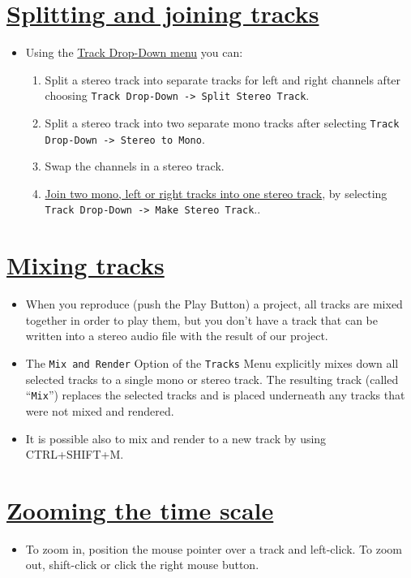 \section{\href{http://manual.audacityteam.org/o/man/splitting_and_joining_stereo_tracks.html}{Splitting and joining tracks}}
\begin{itemize}
\item Using the
  \href{http://manual.audacityteam.org/o/man/track_drop_down_menu.html}{Track
    Drop-Down menu} you can:
  \begin{enumerate}
  \item Split a stereo track into separate tracks for left and right
    channels after choosing
    \verb|Track Drop-Down -> Split Stereo Track|.
  \item Split a stereo track into two separate mono tracks after
    selecting
    \verb|Track Drop-Down -> Stereo to Mono|.
  \item Swap the channels in a stereo track.
  \item
    \href{http://manual.audacityteam.org/o/man/audio_tracks.html}{Join
      two mono, left or right tracks into one stereo track}, by
    selecting \verb|Track Drop-Down -> Make Stereo Track|..
  \end{enumerate}
\end{itemize}

\section{\href{http://manual.audacityteam.org/o/man/tracks_menu.html\#mix}{Mixing tracks}}
\begin{itemize}
\item When you reproduce (push the Play Button) a project, all tracks
  are mixed together in order to play them, but you don't have a track
  that can be written into a stereo audio file with the result of our
  project.
\item The \verb|Mix and Render| Option of the \verb|Tracks| Menu
  explicitly mixes down all selected tracks to a single mono or stereo
  track.  The resulting track (called ``\verb|Mix|'') replaces the
  selected tracks and is placed underneath any tracks that were not
  mixed and rendered.
\item It is possible also to mix and render to a new track by using
  CTRL+SHIFT+M.
\end{itemize}

\section{\href{http://manual.audacityteam.org/o/man/zooming.html}{Zooming the time scale}}
\begin{itemize}
\item To zoom in, position the mouse pointer over a track and
  left-click. To zoom out, shift-click or click the right mouse
  button.
\end{itemize}

